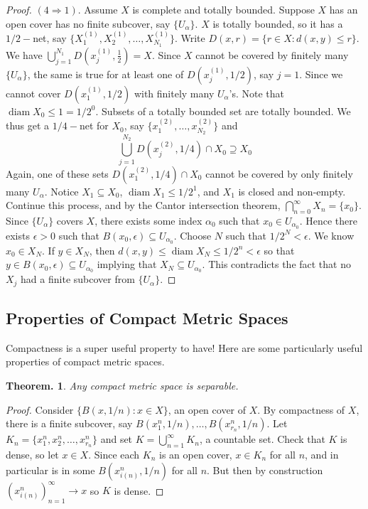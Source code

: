 \documentclass[11pt, a4paper]{memoir}
\theoremstyle{change}
\newtheorem{theorem}{Theorem.}[section]
\theoremstyle{plain}
\theoremstyle{nonumberplain}
\newtheorem{proof}{Proof}
\DeclareMathOperator{\diam}{diam}
\numberwithin{equation}{section}
\begin{document}
\begin{proof}
    $(4\Rightarrow 1)$. Assume $X$ is complete and totally bounded. Suppose $X$ has an open cover has no finite subcover,
    say $\{U_\alpha\}$. $X$ is totally bounded, so it has a $1/2-$net, say $\{X_1^{(1)},X_2^{(1)},\ldots,X_{N_1}^{(1)}\}$.
    Write $D(x,r)=\{r\in X:d(x,y)\leq r\}$. We have $\bigcup_{j=1}^{N_1} D\left(x_j^{(1)},\frac{1}{2}\right)=X$. Since
    $X$ cannot be covered by finitely many $\{U_{\alpha}\}$, the same is true for at least one of $D(x_j^{(1)},1/2)$,
    say $j=1$. Since we cannot cover $D(x_1^{(1)},1/2)$ with finitely many $U_\alpha$'s. Note that $\diam X_0\leq 1=1/2^0$.
    Subsets of a totally bounded set are totally bounded. We thus get a $1/4-$net for $X_0$, say $\{x_1^{(2)},\ldots,x_{N_2}^{(2)}\}$
    and
    \[\bigcup_{j=1}^{N_2} D(x_j^{(2)},1/4)\cap X_0\supseteq X_0\]
    Again, one of these sets $D(x_1^{(2)},1/4)\cap X_0$ cannot be covered by only finitely many $U_{\alpha}$. Notice $X_1\subseteq X_0$,
    $\diam X_1\leq 1/2^1$, and $X_1$ is closed and non-empty. Continue this process, and by the Cantor intersection theorem,
    $\bigcap_{n=0}^\infty X_n=\{x_0\}$. Since $\{U_\alpha\}$ covers $X$, there exists some index $\alpha_0$ such that
    $x_0\in U_{\alpha_0}$. Hence there exists $\epsilon>0$ such that $B(x_0,\epsilon)\subseteq U_{\alpha_0}$. Choose $N$
    such that $1/2^N<\epsilon$. We know $x_0\in X_N$. If $y\in X_N$, then $d(x,y)\leq\diam X_N\leq1/2^n<\epsilon$ so that
    $y\in B(x_0,\epsilon)\subseteq U_{\alpha_0}$ implying that $X_N\subseteq U_{\alpha_0}$. This contradicts the fact that no $X_j$
    had a finite subcover from $\{U_\alpha\}$.
\end{proof}
\subsection{Properties of Compact Metric Spaces}
Compactness is a super useful property to have!
Here are some particularly useful properties of compact metric spaces.
\begin{theorem}
    Any compact metric space is separable.
\end{theorem}
\begin{proof}
    Consider $\{B(x,1/n):x\in X\}$, an open cover of $X$.
    By compactness of $X$, there is a finite subcover, say $B(x_1^n,1/n),\ldots,B(x_{r_n}^n,1/n)$.
    Let $K_n=\{x_1^n,x_2^n,\ldots,x_{r_n}^n\}$ and set $K=\bigcup\limits_{n=1}^\infty K_n$, a countable set.
    Check that $K$ is dense, so let $x\in X$.
    Since each $K_n$ is an open cover, $x\in K_n$ for all $n$, and in particular is in some $B(x_{i(n)}^n,1/n)$ for all $n$.
    But then by construction $(x_{i(n)}^n)_{n=1}^\infty\to x$ so $K$ is dense.
\end{proof}
\end{document}
